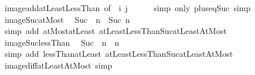 \begin{isabellebody}
\ image{\isacharunderscore}{\kern0pt}add{\isacharunderscore}{\kern0pt}atLeastLessThan\ {\isacharbrackleft}{\kern0pt}of\ {}\ i\ j{\isacharbrackright}{\kern0pt}\isanewline
\ \ \ \ \isamarkupfalse%
\ {\isacharparenleft}{\kern0pt}simp\ only{\isacharcolon}{\kern0pt}\ plus{\isacharunderscore}{\kern0pt}{}{\isacharunderscore}{\kern0pt}eq{\isacharunderscore}{\kern0pt}Suc{\isacharparenright}{\kern0pt}\ simp%
\endisatagproof
{\isafoldproof}%
%
\isadelimproof
\isanewline
%
\endisadelimproof
\isanewline
{}\isamarkupfalse%
\ image{\isacharunderscore}{\kern0pt}Suc{\isacharunderscore}{\kern0pt}atMost{\isacharcolon}{\kern0pt}\isanewline
\ \ {\isachardoublequoteopen}Suc\ {\isacharbackquote}{\kern0pt}\ {\isacharbraceleft}{\kern0pt}{\isachardot}{\kern0pt}{\isachardot}{\kern0pt}n{\isacharbraceright}{\kern0pt}\ {\isacharequal}{\kern0pt}\ {\isacharbraceleft}{\kern0pt}{}{\isachardot}{\kern0pt}{\isachardot}{\kern0pt}Suc\ n{\isacharbraceright}{\kern0pt}{\isachardoublequoteclose}\isanewline
%
\isadelimproof
\ \ %
\endisadelimproof
%
\isatagproof
{}\isamarkupfalse%
\ {\isacharparenleft}{\kern0pt}simp\ add{\isacharcolon}{\kern0pt}\ atMost{\isacharunderscore}{\kern0pt}atLeast{}\ atLeastLessThanSuc{\isacharunderscore}{\kern0pt}atLeastAtMost{\isacharparenright}{\kern0pt}%
\endisatagproof
{\isafoldproof}%
%
\isadelimproof
\isanewline
%
\endisadelimproof
\isanewline
{}\isamarkupfalse%
\ image{\isacharunderscore}{\kern0pt}Suc{\isacharunderscore}{\kern0pt}lessThan{\isacharcolon}{\kern0pt}\isanewline
\ \ {\isachardoublequoteopen}Suc\ {\isacharbackquote}{\kern0pt}\ {\isacharbraceleft}{\kern0pt}{\isachardot}{\kern0pt}{\isachardot}{\kern0pt}{\isacharless}{\kern0pt}n{\isacharbraceright}{\kern0pt}\ {\isacharequal}{\kern0pt}\ {\isacharbraceleft}{\kern0pt}{}{\isachardot}{\kern0pt}{\isachardot}{\kern0pt}n{\isacharbraceright}{\kern0pt}{\isachardoublequoteclose}\isanewline
%
\isadelimproof
\ \ %
\endisadelimproof
%
\isatagproof
{}\isamarkupfalse%
\ {\isacharparenleft}{\kern0pt}simp\ add{\isacharcolon}{\kern0pt}\ lessThan{\isacharunderscore}{\kern0pt}atLeast{}\ atLeastLessThanSuc{\isacharunderscore}{\kern0pt}atLeastAtMost{\isacharparenright}{\kern0pt}%
\endisatagproof
{\isafoldproof}%
%
\isadelimproof
\isanewline
%
\endisadelimproof
\isanewline
{}\isamarkupfalse%
\ image{\isacharunderscore}{\kern0pt}diff{\isacharunderscore}{\kern0pt}atLeastAtMost\ {\isacharbrackleft}{\kern0pt}simp{\isacharbrackright}{\kern0pt}{\isacharcolon}{\kern0pt}\isanewline

\end{isabellebody}
